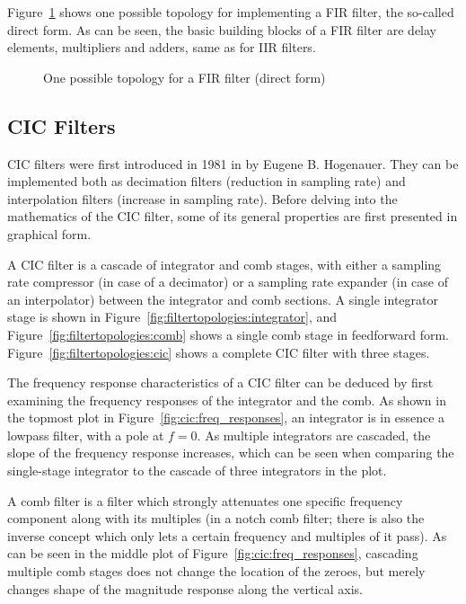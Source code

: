 Figure~\ref{fig:filtertopologies:fir}   shows   one  possible   topology   for
implementing a  FIR filter,  the so-called  direct form. As  can be  seen, the
basic building  blocks of  a FIR  filter are  delay elements,  multipliers and
adders, same as for IIR filters.

\begin{figure}
    \centering
    
    \caption[FIR Filter Topology Example]
        {One possible topology for a FIR filter (direct form)}
    \label{fig:filtertopologies:fir}
\end{figure}


\subsection{CIC Filters} %
\label{subsec:CIC_filters}

CIC  filters  were  first  introduced  in 1981  in  \cite{1163535}  by  Eugene
B. Hogenauer. They can be implemented both as decimation filters (reduction in
sampling rate)  and interpolation filters (increase  in sampling rate). Before
delving into the mathematics of the CIC filter, some of its general properties
are first presented in graphical form.

A   CIC  filter   is  a   cascade  of   integrator  and   comb  stages,   with
either   a   sampling    rate   compressor   (in   case    of   a   decimator)
or   a    sampling   rate    expander   (in    case   of    an   interpolator)
between   the   integrator   and   comb   sections.    A   single   integrator
stage   is   shown    in   Figure~\ref{fig:filtertopologies:integrator},   and
Figure~\ref{fig:filtertopologies:comb}   shows   a   single  comb   stage   in
feedforward form. Figure~\ref{fig:filtertopologies:cic}  shows a  complete CIC
filter with three stages.

The frequency response characteristics of a CIC filter can be deduced by first
examining the frequency responses of the  integrator and the comb. As shown in
the topmost  plot in Figure~\ref{fig:cic:freq_responses}, an  integrator is in
essence a lowpass filter, with a pole  at $f = 0$. As multiple integrators are
cascaded, the  slope of the  frequency response  increases, which can  be seen
when comparing the single-stage integrator to the cascade of three integrators
in the plot.

A  comb   filter  is   a  filter  which   strongly  attenuates   one  specific
frequency  component  along  with  its  multiples (in  a  notch  comb  filter;
there  is  also the  inverse  concept  which  only  lets a  certain  frequency
and  multiples   of  it  pass). As  can   be  seen  in  the   middle  plot  of
Figure~\ref{fig:cic:freq_responses}, cascading  multiple comb stages  does not
change the location  of the zeroes, but merely changes  shape of the magnitude
response along the vertical axis.

